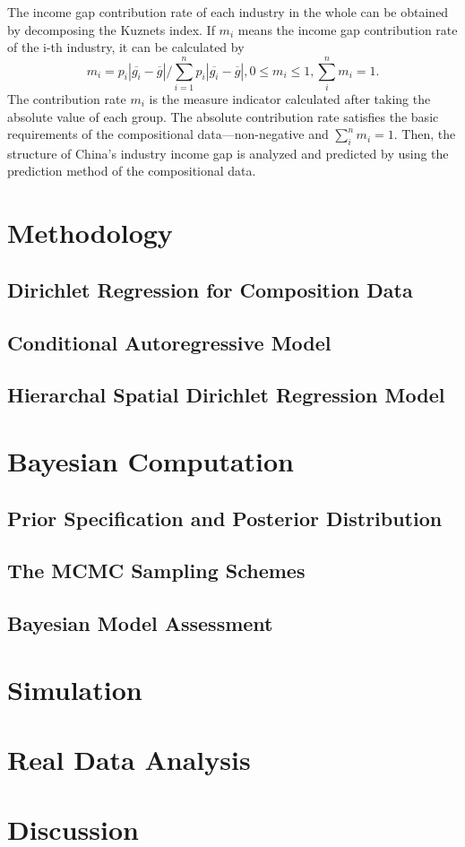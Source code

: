 \documentclass[12pt, titlepage]{article}
\begin{document}
The income gap contribution rate of each industry in the whole can be
obtained by decomposing the Kuznets index. If $m_{i}$ means the income
gap contribution rate of the i-th industry, it can be calculated by
\[
  m_{i}=p_{i}\left|\overline{g_{i}}-\overline{g}\right|/\sum_{i=1}^np_{i}\left|\overline{g_{i}}-\overline{g}\right|,0\leq
  m_{i}\leq 1,\sum_{i}^nm_{i}=1.
\]
The contribution rate $m_{i}$ is the measure indicator calculated
after taking the absolute value of each group. The absolute
contribution rate satisfies the basic requirements of the
compositional data—non-negative and $\sum_{i}^nm_{i}=1$. Then, the
structure of China's industry income gap is analyzed and predicted by
using the prediction method of the compositional data.

\section{Methodology}
\subsection{Dirichlet Regression for Composition Data}
\subsection{Conditional Autoregressive Model}
\subsection{Hierarchal Spatial Dirichlet Regression Model}

\section{Bayesian Computation}
\subsection{Prior Specification and Posterior Distribution}
\subsection{The MCMC Sampling Schemes}
\subsection{Bayesian Model Assessment}
\section{Simulation}
\section{Real Data Analysis}
\section{Discussion}


 
\end{document}
